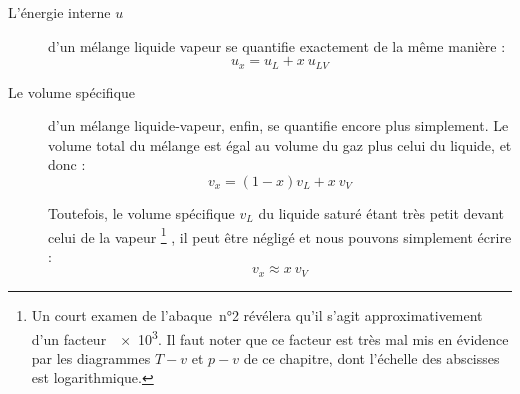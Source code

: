 \begin{description}
			\item[L’énergie interne $u$]{d’un mélange liquide vapeur se quantifie exactement de la même manière :
				\begin{equation}
					u_x = u_L + x \ u_{LV}
					\label{eq_titre_energie_interne}
				\end{equation}
			} %

			\clearfloats %
			\item[Le volume spécifique]{d’un mélange liquide-vapeur, enfin, se quantifie encore plus simplement. Le volume total du mélange est égal au volume du gaz plus celui du liquide, et donc :
				\begin{equation*}
					v_x = (1-x) v_L + x \ v_V
				\end{equation*}

				Toutefois, le volume spécifique $v_L$ du liquide saturé étant très petit devant celui de la vapeur%
					\footnote{Un court examen de l’abaque~n°2 révélera qu’il s’agit approximativement d’un facteur~\num{e3}. Il faut noter que ce facteur est très mal mis en évidence par les diagrammes $T-v$ et $p-v$ de ce chapitre, dont l’échelle des abscisses est logarithmique.}%
				, il peut être négligé et nous pouvons simplement écrire :
				\begin{equation}
					v_x \approx x \ v_V
					\label{eq_titre_volume_specifique}
				\end{equation}

}
\end{description}
